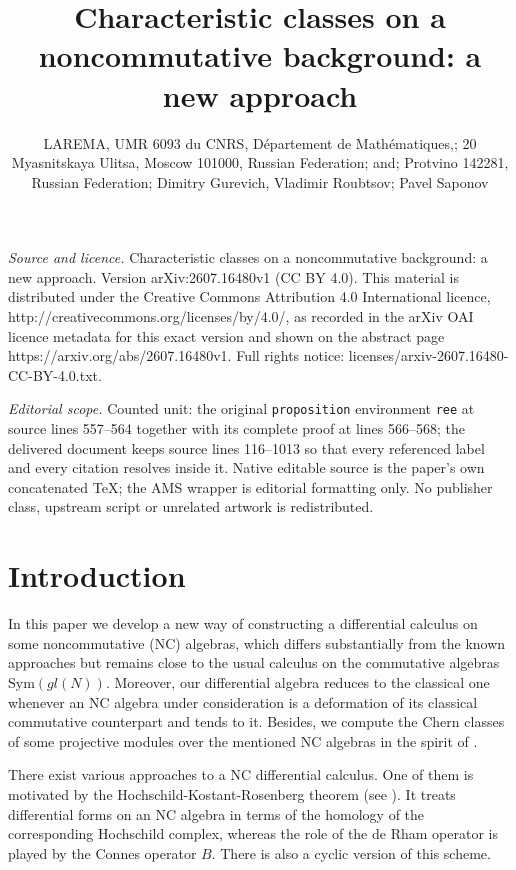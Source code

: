 \documentclass[10pt,a4paper]{amsart}
\numberwithin{equation}{section}
\begin{document}
\title[Characteristic classes on a noncommutative background: a new]{Characteristic classes on a noncommutative background: a new approach}
\author{LAREMA, UMR 6093 du CNRS, Département de Mathématiques,; 20 Myasnitskaya Ulitsa, Moscow 101000, Russian Federation; and; Protvino 142281, Russian Federation; Dimitry Gurevich, Vladimir Roubtsov; Pavel Saponov}
\date{}
\maketitle
\noindent\emph{Source and licence.} Characteristic classes on a noncommutative background: a new approach. Version arXiv:2607.16480v1 (CC BY 4.0). This material is distributed under the Creative Commons Attribution 4.0 International licence, http://creativecommons.org/licenses/by/4.0/, as recorded in the arXiv OAI licence metadata for this exact version and shown on the abstract page https://arxiv.org/abs/2607.16480v1. Full rights notice: licenses/arxiv-2607.16480-CC-BY-4.0.txt.\par\smallskip
\noindent\textit{Editorial scope.} Counted unit: the original \texttt{proposition} environment \texttt{ree} at source lines 557--564 together with its complete proof at lines 566--568; the delivered document keeps source lines 116--1013 so that every referenced label and every citation resolves inside it. Native editable source is the paper's own concatenated TeX; the AMS wrapper is editorial formatting only. No publisher class, upstream script or unrelated artwork is redistributed.
\section{Introduction}\label{sec:introduction}

In this  paper we develop a new way of constructing a differential calculus on some noncommutative (NC) algebras, which
differs substantially from the known approaches but remains close to the usual calculus on the commutative algebras
$\mathrm{Sym}(gl(N))$. Moreover, our differential algebra reduces to the classical one whenever an NC algebra under
consideration is a deformation of its classical commutative counterpart and tends to it. Besides, we compute the
Chern classes of some projective modules over the mentioned NC algebras in the spirit of \cite{Gom}.

 There exist various approaches to a NC differential calculus. One  of them is motivated by the
Hochschild-Kostant-Rosenberg theorem (see \cite{L}). It treats differential forms on an NC algebra in terms of the homology of the
corresponding Hochschild complex, whereas  the role of the de Rham operator is played by the Connes operator $B$. There is
also a cyclic version of this scheme.
\end{document}
